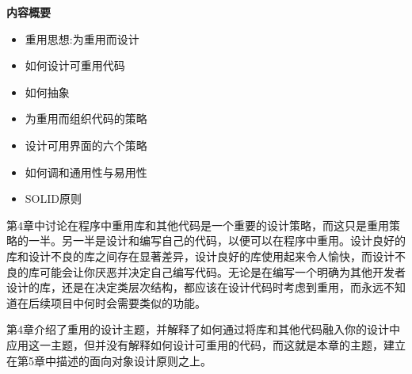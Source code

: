 \noindent
\textbf{内容概要}

\begin{itemize}
\item
重用思想:为重用而设计

\item
如何设计可重用代码

\item
如何抽象

\item
为重用而组织代码的策略

\item
设计可用界面的六个策略

\item
如何调和通用性与易用性

\item
SOLID原则
\end{itemize}

第4章中讨论在程序中重用库和其他代码是一个重要的设计策略，而这只是重用策略的一半。另一半是设计和编写自己的代码，以便可以在程序中重用。设计良好的库和设计不良的库之间存在显著差异，设计良好的库使用起来令人愉快，而设计不良的库可能会让你厌恶并决定自己编写代码。无论是在编写一个明确为其他开发者设计的库，还是在决定类层次结构，都应该在设计代码时考虑到重用，而永远不知道在后续项目中何时会需要类似的功能。

第4章介绍了重用的设计主题，并解释了如何通过将库和其他代码融入你的设计中应用这一主题，但并没有解释如何设计可重用的代码，而这就是本章的主题，建立在第5章中描述的面向对象设计原则之上。
